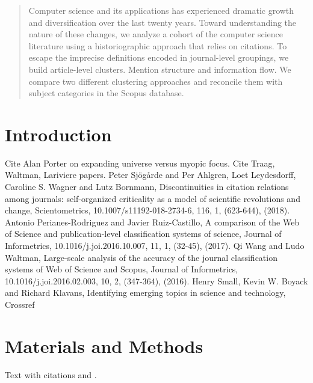 \date{Received: date / Accepted: date}


\maketitle

\begin{abstract}
Computer science and its applications has experienced dramatic growth and diversification over the last twenty years. Toward understanding the nature of these changes, we analyze a cohort of the computer science literature using a historiographic approach that relies on citations. To escape the imprecise definitions encoded in journal-level groupings, we build article-level clusters. Mention structure and information flow. We compare two different clustering approaches and reconcile them with subject categories in the Scopus database.

\end{abstract}

\section{Introduction}
\label{intro}

Cite Alan Porter on expanding universe versus myopic focus. Cite Traag, Waltman, Lariviere papers. Peter Sjögårde and Per Ahlgren, Loet Leydesdorff, Caroline S. Wagner and Lutz Bornmann, Discontinuities in citation relations among journals: self-organized criticality as a model of scientific revolutions and change, Scientometrics, 10.1007/s11192-018-2734-6, 116, 1, (623-644), (2018). Antonio Perianes-Rodriguez and Javier Ruiz-Castillo, A comparison of the Web of Science and publication-level classification systems of science, Journal of Informetrics, 10.1016/j.joi.2016.10.007, 11, 1, (32-45), (2017). Qi Wang and Ludo Waltman, Large-scale analysis of the accuracy of the journal classification systems of Web of Science and Scopus, Journal of Informetrics, 10.1016/j.joi.2016.02.003, 10, 2, (347-364), (2016). Henry Small, Kevin W. Boyack and Richard Klavans, Identifying emerging topics in science and technology, 
Crossref
\section{Materials and Methods}
\label{sec:1}
Text with citations \cite{RefB} and \cite{RefJ}.

